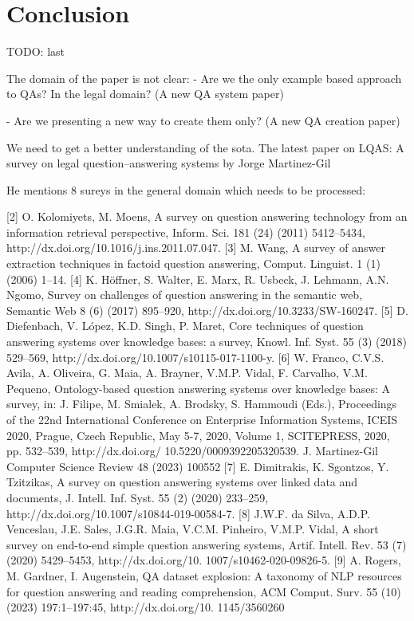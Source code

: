 \documentclass{IOS-Book-Article}
\begin{document}
\section{Conclusion}

TODO: last

The domain of the paper is not clear:
- Are we the only example based approach to QAs? In the legal domain? (A new QA system paper)

- Are we presenting a new way to create them only? (A new QA creation paper)

We need to get a better understanding of the sota. The latest paper on LQAS: A survey on legal question–answering systems by Jorge Martinez-Gil

He mentions 8 sureys in the general domain which needs to be processed:

[2] O. Kolomiyets, M. Moens, A survey on question answering technology
from an information retrieval perspective, Inform. Sci. 181 (24) (2011)
5412–5434, http://dx.doi.org/10.1016/j.ins.2011.07.047.
[3] M. Wang, A survey of answer extraction techniques in factoid question
answering, Comput. Linguist. 1 (1) (2006) 1–14.
[4] K. Höffner, S. Walter, E. Marx, R. Usbeck, J. Lehmann, A.N. Ngomo, Survey
on challenges of question answering in the semantic web, Semantic Web
8 (6) (2017) 895–920, http://dx.doi.org/10.3233/SW-160247.
[5] D. Diefenbach, V. López, K.D. Singh, P. Maret, Core techniques of question
answering systems over knowledge bases: a survey, Knowl. Inf. Syst. 55
(3) (2018) 529–569, http://dx.doi.org/10.1007/s10115-017-1100-y.
[6] W. Franco, C.V.S. Avila, A. Oliveira, G. Maia, A. Brayner, V.M.P. Vidal,
F. Carvalho, V.M. Pequeno, Ontology-based question answering systems
over knowledge bases: A survey, in: J. Filipe, M. Smialek, A. Brodsky, S.
Hammoudi (Eds.), Proceedings of the 22nd International Conference on
Enterprise Information Systems, ICEIS 2020, Prague, Czech Republic, May
5-7, 2020, Volume 1, SCITEPRESS, 2020, pp. 532–539, http://dx.doi.org/
10.5220/0009392205320539.
J. Martinez-Gil Computer Science Review 48 (2023) 100552
[7] E. Dimitrakis, K. Sgontzos, Y. Tzitzikas, A survey on question answering
systems over linked data and documents, J. Intell. Inf. Syst. 55 (2) (2020)
233–259, http://dx.doi.org/10.1007/s10844-019-00584-7.
[8] J.W.F. da Silva, A.D.P. Venceslau, J.E. Sales, J.G.R. Maia, V.C.M. Pinheiro,
V.M.P. Vidal, A short survey on end-to-end simple question answering
systems, Artif. Intell. Rev. 53 (7) (2020) 5429–5453, http://dx.doi.org/10.
1007/s10462-020-09826-5.
[9] A. Rogers, M. Gardner, I. Augenstein, QA dataset explosion: A taxonomy
of NLP resources for question answering and reading comprehension,
ACM Comput. Surv. 55 (10) (2023) 197:1–197:45, http://dx.doi.org/10.
1145/3560260
\end{document}

